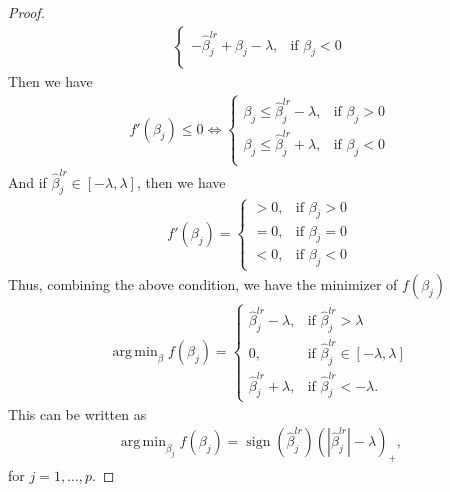\documentclass[10pt]{article}
\DeclareMathOperator*{\argmin}{arg\,min}
\begin{document}
\begin{proof}
\begin{align*}
\begin{cases}
            -\hat{\beta}^{lr}_j + \beta_j - \lambda, & \text{if } \beta_j < 0\\
        \end{cases}
     \end{align*}
     Then we have
     \begin{align*}
        f'(\beta_j)\leq 0 \Leftrightarrow \begin{cases}
            \beta_j \leq \hat{\beta}^{lr}_j - \lambda, & \text{if } \beta_j > 0\\
            \beta_j \leq \hat{\beta}^{lr}_j + \lambda, & \text{if } \beta_j < 0\\
        \end{cases}
     \end{align*}
     And if $\hat{\beta}^{lr}_j \in [-\lambda, \lambda]$, then we have
        \begin{align*}
            f'(\beta_j)=\begin{cases}
                > 0, & \text{if } \beta_j > 0\\
                = 0, & \text{if } \beta_j = 0\\
                < 0, & \text{if } \beta_j < 0
            \end{cases}
        \end{align*}
     Thus, combining the above condition, we have the minimizer of $f(\beta_j)$ 
     \begin{align*}
        \argmin_{\beta} f(\beta_j)=\begin{cases}
            \hat{\beta}^{lr}_j - \lambda, & \text{if } \hat{\beta}^{lr}_j > \lambda\\
            0, & \text{if } \hat{\beta}^{lr}_j \in [-\lambda, \lambda]\\
            \hat{\beta}^{lr}_j + \lambda, & \text{if } \hat{\beta}^{lr}_j < -\lambda.
        \end{cases}
     \end{align*}
     This can be written as
        \begin{align*}
            \argmin_{\beta_j} f(\beta_j)=\operatorname{sign}\left(\hat{\beta}^{lr}_j\right)\left(\left|\hat{\beta}^{lr}_j\right|-\lambda\right)_{+},
        \end{align*}
        for $j=1,\ldots,p$. 

\end{proof}
\end{document}
